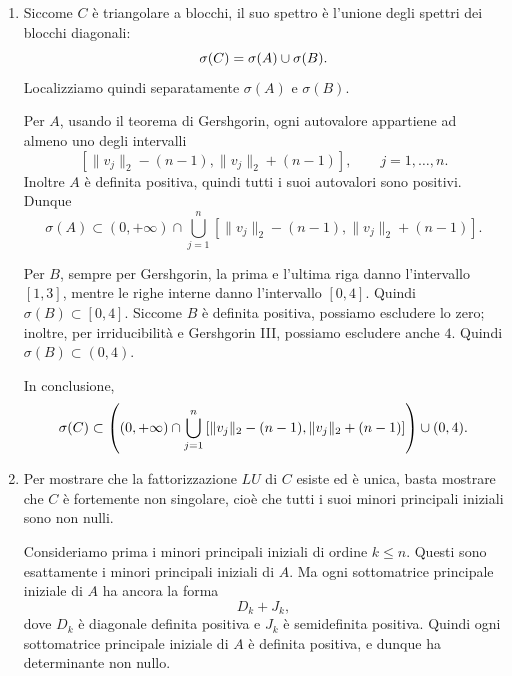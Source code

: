 \documentclass[a4paper]{article}
\begin{document}
\begin{snippetsolution}{}
\begin{enumerate}
        \item Siccome \(C\) è triangolare a blocchi, il suo spettro è l'unione degli spettri
            dei blocchi diagonali:
            \[
                \sigma(C) = \sigma(A) \cup \sigma(B).
            \]
            Localizziamo quindi separatamente \(\sigma(A)\) e \(\sigma(B)\).

            Per \(A\), usando il teorema di Gershgorin, ogni autovalore appartiene
            ad almeno uno degli intervalli
            \[
                \left[
                    \|v_j\|_2-(n-1),
                    \|v_j\|_2+(n-1)
                \right],
                \qquad j=1,\ldots,n.
            \]
            Inoltre \(A\) è definita positiva, quindi tutti i suoi autovalori sono positivi.
            Dunque
            \[
                \sigma(A)
                \subset
                (0,+\infty)
                \cap
                \bigcup_{j=1}^n
                \left[
                    \|v_j\|_2-(n-1),
                    \|v_j\|_2+(n-1)
                \right].
            \]

            Per \(B\), sempre per Gershgorin, la prima e l'ultima riga danno
            l'intervallo \([1,3]\), mentre le righe interne danno l'intervallo
            \([0,4]\). Quindi \(\sigma(B) \subset [0,4]\).
            Siccome \(B\) è definita positiva, possiamo escludere lo zero; inoltre, per irriducibilità e Gershgorin III, possiamo escludere anche \(4\). Quindi \(\sigma(B) \subset (0,4)\).

            In conclusione,
            \[
                \sigma(C)
                \subset
                \left(
                    (0,+\infty)
                    \cap
                    \bigcup_{j=1}^n
                    \left[
                        \|v_j\|_2-(n-1),
                        \|v_j\|_2+(n-1)
                    \right]
                \right)
                \cup
                (0,4).
            \]

        \item Per mostrare che la fattorizzazione \(LU\) di \(C\) esiste ed è unica,
            basta mostrare che \(C\) è fortemente non singolare, cioè che tutti
            i suoi minori principali iniziali sono non nulli.

            Consideriamo prima i minori principali iniziali di ordine \(k \leq n\).
            Questi sono esattamente i minori principali iniziali di \(A\).
            Ma ogni sottomatrice principale iniziale di \(A\) ha ancora la forma
            \[
                D_k + J_k,
            \]
            dove \(D_k\) è diagonale definita positiva e \(J_k\) è semidefinita positiva.
            Quindi ogni sottomatrice principale iniziale di \(A\) è definita positiva,
            e dunque ha determinante non nullo.


\end{enumerate}
\end{snippetsolution}
\end{document}

